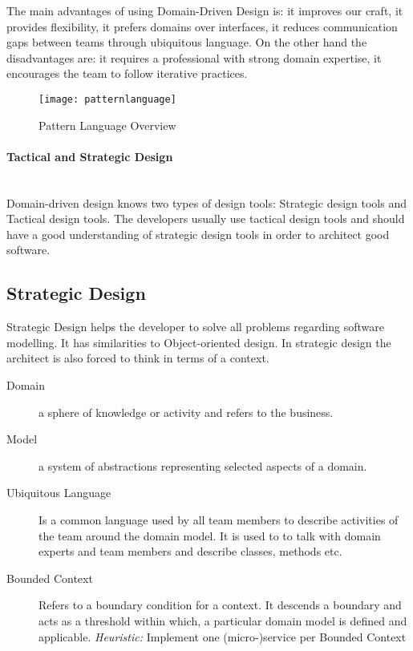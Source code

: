 The main advantages of using Domain-Driven Design is: it improves our craft, it provides flexibility, it prefers domains over interfaces, it reduces communication gaps between teams through ubiquitous language. On the other hand the disadvantages are: it requires a professional with strong domain expertise, it encourages the team to follow iterative practices.

\begin{figure}[H]
  \center
  \texttt{[image: patternlanguage]}
  \caption{Pattern Language Overview}
\end{figure}


\paragraph{Tactical and Strategic Design} \hfill \\
Domain-driven design knows two types of design tools: Strategic design tools and Tactical design tools. The developers usually use tactical design tools and should have a good understanding of strategic design tools in order to architect good software.

\pagebreak

\subsection{Strategic Design}
Strategic Design helps the developer to solve all problems regarding software modelling. It has similarities to Object-oriented design. In strategic design the architect is also forced to think in terms of a context.

\begin{description}
  \item [Domain] a sphere of knowledge or activity and refers to the business.
  \item [Model] a system of abstractions representing selected aspects of a domain.
  \item [Ubiquitous Language] Is a common language used by all team members to describe activities of the team around the domain model. It is used to to talk with domain experts and team members and describe classes, methods etc.
  \item [Bounded Context] Refers to a boundary condition for a context. It descends a boundary and acts as a threshold within which, a particular domain model is defined and applicable. \textit{Heuristic:} Implement one (micro-)service per Bounded Context
\end{description}

